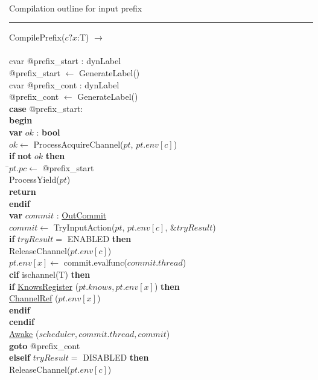 \documentclass[a4paper,11pt]{article}
\newenvironment{program}{
  \begin{sffamily}
  \begin{scriptsize}
  \begin{tabbing}}
 {\end{tabbing}
  \end{scriptsize}
  \end{sffamily}}
\newcommand{\kw}[1]{\textsf{\textbf{#1}}}
\newcommand{\pindent}{\hspace{2em}\=}
\newcommand{\compiletime}[1]{\textcolor{compilecolor}{#1}}
\newcommand{\synchro}[1]{\textcolor{synchrocolor}{#1}}
\newcommand{\algotitle}[1]{\noindent\\ \noindent#1\par\nobreak\vspace{3pt}\hrule\vspace{6pt}}
\newcommand{\algosection}[1]{
  \phantomsection
  \algotitle{#1}
}
\newcommand{\myref}[1]{
  \hyperref[#1]{#1}
}
\begin{document}
\algosection{Compilation outline for input prefix}
\begin{program}
  \compiletime{CompilePrefix($c?x$:T) $\rightarrow$} \\ \\
  \compiletime{cvar @prefix\_start : dynLabel} \\
  \compiletime{@prefix\_start $\leftarrow$ GenerateLabel()} \\
  \compiletime{cvar @prefix\_cont : dynLabel} \\
  \compiletime{@prefix\_cont $\leftarrow$ GenerateLabel()} \\
  \kw{case} @prefix\_start: \\
  \kw{begin} \\
   \pindent \kw{var} $ok$ : \kw{bool} \\
   \> $ok \leftarrow $ ProcessAcquireChannel($pt$, $pt.env[c]$) \\
  \> \kw{if} \kw{not} $ok$  \kw{then} \\
  \> \pindent $pt.pc \leftarrow $ @prefix\_start \\
  \>  \> ProcessYield($pt$) \\
  \>  \> \kw{return}\\
  \>  \kw{endif} \\
  \pindent\kw{var} $commit$ : \myref{OutCommit} \\
  \> $commit \leftarrow$ TryInputAction($pt$, $pt.env[c]$, $\& tryResult$) \\
  \>\kw{if} $tryResult =$ ENABLED \kw{then} \\
  \>\pindent \synchro{ReleaseChannel($pt.env[c]$)} \\
  \>\> $pt.env[x] \leftarrow$ commit.evalfunc($commit.thread$) \\
  \>\>\compiletime{\kw{cif} ischannel(T) \kw{then}} \\
  \>\>\pindent\kw{if} \myref{KnowsRegister}($pt.knows, pt.env[x]$) \kw{then} \\
  \>\>\>\pindent \myref{ChannelRef}($pt.env[x]$) \\
  \>\>\>\kw{endif} \\
  \>\>\compiletime{\kw{cendif}} \\
  \>\>\myref{Awake}($scheduler, commit.thread, commit$) \\
  \>\>\kw{goto} @prefix\_cont \\
  \>\kw{elseif} $tryResult =$ DISABLED \kw{then} \\
  \>\> \synchro{ReleaseChannel($pt.env[c]$)} \\

\end{program}
\end{document}

